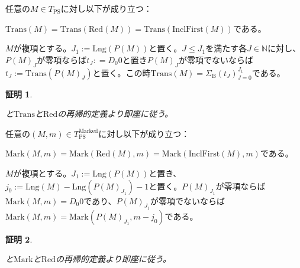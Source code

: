 \documentclass[dvipdfmx,uplatex]{jsarticle}
\theoremstyle{customnonumberbreakfortheorem}
\theoremstyle{customnonumberbreakforproof}
\newtheorem{hideableproof}{証明}
\begin{document}
\begin{proposition}\label{Transの(IncrFirst,Red)不変P同変性}
	任意の\(M \in T_{\textrm{PS}}\)に対し以下が成り立つ：
	\begin{penumerate}
		\item \(\textrm{Trans}(M) = \textrm{Trans}(\textrm{Red}(M)) = \textrm{Trans}(\textrm{InclFirst}(M))\)である。
		\item \(M\)が複項とする。\(J_1 := \textrm{Lng}(P(M))\)と置く。\(J \leq J_1\)を満たす各\(J \in \mathbb{N}\)に対し、\(P(M)_J\)が零項ならば\(t_J : = D_0 0\)と置き\(P(M)_J\)が零項でないならば\(t_J := \textrm{Trans}(P(M)_J)\)と置く。この時\(\textrm{Trans}(M) = \Sigma_{\textrm{B}} (t_J)_{J=0}^{J_1}\)である。
	\end{penumerate}
\end{proposition}

\begin{hideableproof}
	\begin{indented}
		\item {}と\(\textrm{Trans}\)と\(\textrm{Red}\)の再帰的定義より即座に従う。
	\end{indented}
\end{hideableproof}

\begin{proposition}\label{Markの(IncrFirst,Red,P)不変性}
	任意の\((M,m) \in T_{\textrm{PS}}^{\textrm{Marked}}\)に対し以下が成り立つ：
	\begin{penumerate}
		\item \(\textrm{Mark}(M,m) = \textrm{Mark}(\textrm{Red}(M),m) = \textrm{Mark}(\textrm{InclFirst}(M),m)\)である。
		\item \(M\)が複項とする。\(J_1 := \textrm{Lng}(P(M))\)と置き、\(j_0 := \textrm{Lng}(M) - \textrm{Lng}(P(M)_{J_1}) - 1\)と置く。\(P(M)_{J_1}\)が零項ならば\(\textrm{Mark}(M,m) = D_0 0\)であり、\(P(M)_{J_1}\)が零項でないならば\(\textrm{Mark}(M,m) = \textrm{Mark}(P(M)_{J_1},m-j_0)\)である。
	\end{penumerate}
\end{proposition}

\begin{hideableproof}
	\begin{indented}
		\item {}と\(\textrm{Mark}\)と\(\textrm{Red}\)の再帰的定義より即座に従う。
	\end{indented}
\end{hideableproof}
\end{document}
